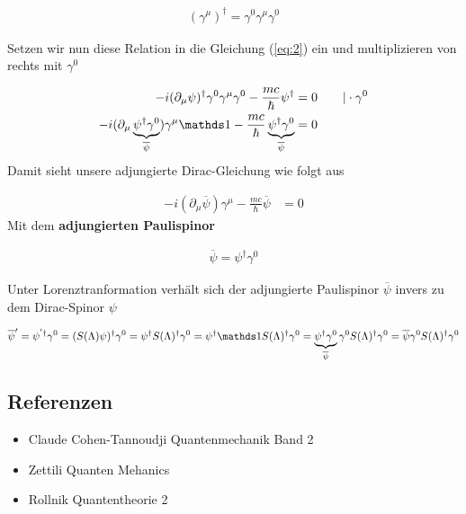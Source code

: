 \begin{align}
  \label{eq:4}
  \boxed{ (\gamma^\mu)^\dagger = \gamma^0\gamma^\mu\gamma^0  }
\end{align}

Setzen wir nun diese Relation in die Gleichung (\ref{eq:2}) ein und multiplizieren von rechts mit \(\gamma^0\)

\begin{align}
  \label{eq:5}
  -i(\partial_\mu\psi)^\dagger\gamma^0\gamma^\mu\gamma^0   - \frac{mc}{\hbar}\psi^\dagger &= 0 \qquad |\cdot\gamma^0 \notag\\
-i(\partial_\mu\underbr{\psi^\dagger\gamma^0}_{\overline \psi})\gamma^\mu\mathds 1  - \frac{mc}{\hbar}\underbr{\psi^\dagger\gamma^0}_{\overline \psi} &= 0 
\end{align}
Damit sieht unsere adjungierte Dirac-Gleichung wie folgt aus

\begin{align}
  \label{eq:6}
  -i(\partial_\mu\overline \psi)\gamma^\mu  - \frac{mc}{\hbar}\overline \psi &= 0 
\end{align}
Mit dem \textbf{adjungierten Paulispinor} 

\begin{align}
  \label{eq:7}
  \boxed{\overline \psi = \psi^\dagger\gamma^0}
\end{align}

Unter Lorenztranformation verhält sich der adjungierte Paulispinor \(\overline \psi\)  invers zu dem Dirac-Spinor \(\psi\)

\begin{align}
  \label{eq:8}
  \overline \psi'= \psi^{'\dagger}\gamma^0  = (S(\Lambda)\psi)^\dagger\gamma^0 = \psi^\dagger S(\Lambda)^\dagger \gamma^0 = \psi^\dagger\mathds 1 S(\Lambda)^\dagger \gamma^0 = \underbr{\psi^\dagger \gamma^0}_{\overline\psi}\gamma^0 S(\Lambda)^\dagger \gamma^0  =  \overline\psi \gamma^0 S(\Lambda)^\dagger \gamma^0 
\end{align}







\subsection*{Referenzen}
\begin{itemize}
\item Claude Cohen-Tannoudji Quantenmechanik Band 2
\item Zettili Quanten Mehanics
\item Rollnik Quantentheorie 2
\end{itemize}


